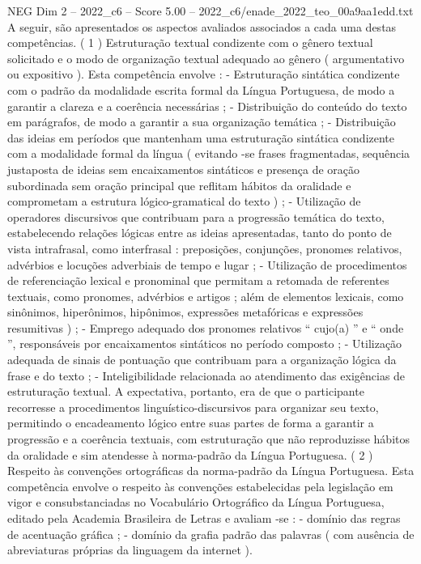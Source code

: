 \begin{textsample}{NEG Dim 2 – 2022\_c6 – Score 5.00 – 2022\_c6/enade\_2022\_teo\_00a9aa1edd.txt}
A seguir, são apresentados os aspectos avaliados associados a cada uma destas competências. ( 1 ) Estruturação textual condizente com o gênero textual solicitado e o modo de organização textual adequado ao gênero ( argumentativo ou expositivo ).
Esta competência envolve : - Estruturação sintática condizente com o padrão da modalidade escrita formal da Língua Portuguesa, de modo a garantir a clareza e a coerência necessárias ; - Distribuição do conteúdo do texto em parágrafos, de modo a garantir a sua organização temática ; - Distribuição das ideias em períodos que mantenham uma estruturação sintática condizente com a modalidade formal da língua ( evitando -se frases fragmentadas, sequência justaposta de ideias sem encaixamentos sintáticos e presença de oração subordinada sem oração principal que reflitam hábitos da oralidade e comprometam a estrutura lógico-gramatical do texto ) ; - Utilização de operadores discursivos que contribuam para a progressão temática do texto, estabelecendo relações lógicas entre as ideias apresentadas, tanto do ponto de vista intrafrasal, como interfrasal : preposições, conjunções, pronomes relativos, advérbios e locuções adverbiais de tempo e lugar ; - Utilização de procedimentos de referenciação lexical e pronominal que permitam a retomada de referentes textuais, como pronomes, advérbios e artigos ; além de elementos lexicais, como sinônimos, hiperônimos, hipônimos, expressões metafóricas e expressões resumitivas ) ; - Emprego adequado dos pronomes relativos “ cujo(a) ” e “ onde ”, responsáveis por encaixamentos sintáticos no período composto ; - Utilização adequada de sinais de pontuação que contribuam para a organização lógica da frase e do texto ; - Inteligibilidade relacionada ao atendimento das exigências de estruturação textual.
A expectativa, portanto, era de que o participante recorresse a procedimentos linguístico-discursivos para organizar seu texto, permitindo o encadeamento lógico entre suas partes de forma a garantir a progressão e a coerência textuais, com estruturação que não reproduzisse hábitos da oralidade e sim atendesse à norma-padrão da Língua Portuguesa. ( 2 ) Respeito às convenções ortográficas da norma-padrão da Língua Portuguesa.
Esta competência envolve o respeito às convenções estabelecidas pela legislação em vigor e consubstanciadas no Vocabulário Ortográfico da Língua Portuguesa, editado pela Academia Brasileira de Letras e avaliam -se : - domínio das regras de acentuação gráfica ; - domínio da grafia padrão das palavras ( com ausência de abreviaturas próprias da linguagem da internet ).

\end{textsample}
